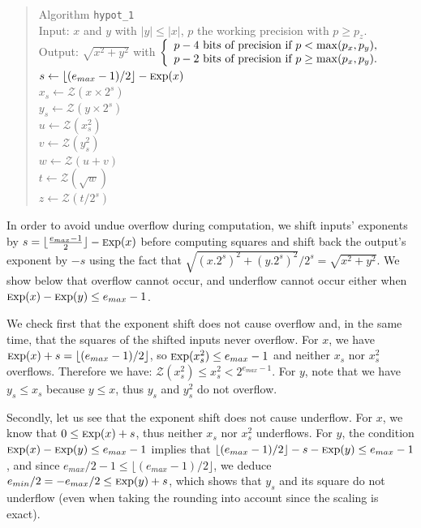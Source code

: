\documentclass[12pt]{amsart}
\def\Exp{{\rm \textsc exp}}
\def\Z{{\mathcal Z}}
\begin{document}
\begin{quote}
  Algorithm {\tt hypot\_1}\\
  Input: $x$ and $y$ with $|y| \leq |x|$,
  $p$ the working precision with $p \geq p_z$.\\
  Output: $\sqrt{x^2+y^2}$ with $\left\{
  \begin{array}{l}
    p-4 \textnormal{ bits of precision if } p < \max(p_x, p_y),\\
    p-2 \textnormal{ bits of precision if } p \geq \max(p_x, p_y).
  \end{array}\right.$\\
  $s \leftarrow \lfloor (e_{max}-1)/2 \rfloor - \Exp(x)$\\
  $x_s \leftarrow \Z(x\times 2^s)$\\
  $y_s \leftarrow \Z(y\times 2^s)$\\
  $u \leftarrow \Z(x_s^2)$\\
  $v \leftarrow \Z(y_s^2)$\\
  $w \leftarrow \Z(u+v)$\\
  $t \leftarrow \Z(\sqrt{w})$\\
  $z \leftarrow \Z(t/2^s)$
\end{quote}

In order to avoid undue overflow during computation, we shift inputs'
exponents by $s = \lfloor\frac{e_{max}-1}{2}\rfloor - \Exp(x)$ before
computing squares and shift back the output's exponent by $-s$ using the fact
that $\sqrt{(x.2^s)^2+(y.2^s)^2}/2^s = \sqrt{x^2+y^2}$. We show below that
overflow cannot occur, and underflow cannot occur either when
$\Exp(x) - \Exp(y) \leq e_{max} - 1$.

We check first that the exponent shift does not cause overflow and, in the
same time, that the squares of the shifted inputs never overflow.
For $x$, we have $\Exp(x) + s = \lfloor (e_{max}-1)/2 \rfloor$, so
$\Exp(x_s^2) \leq e_{max} - 1$ and neither $x_s$ nor $x_s^2$ overflows.
Therefore we have: $\Z(x_s^2) \leq x_s^2 < 2^{e_{max} - 1}$.
For $y$, note that we have $y_s \leq x_s$ because $y \leq x$, thus $y_s$
and $y_s^2$ do not overflow.

Secondly, let us see that the exponent shift does not cause underflow. For
$x$, we know that $0 \leq \Exp(x) + s$, thus neither $x_s$ nor $x_s^2$
underflows. For $y$, the condition $\Exp(x) - \Exp(y) \leq e_{max} - 1$
implies that $\lfloor(e_{max}-1)/2\rfloor - s - \Exp(y) \leq e_{max} - 1$,
and since $e_{max}/2-1 \leq \lfloor(e_{max}-1)/2\rfloor$, we deduce
$e_{min}/2 = -e_{max}/2 \leq \Exp(y) + s$, which shows that $y_s$ and
its square do not underflow (even when taking the rounding into account
since the scaling is exact).
\end{document}

